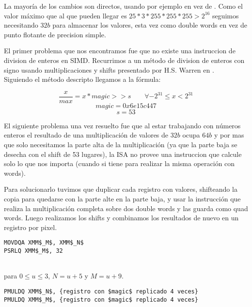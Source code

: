 La mayoría de los cambios son directos, usando por ejemplo  en vez de . Como el valor máximo que al que pueden llegar es $25 * 3 * 255 * 255 * 255 > 2^{16}$ seguimos necesitando $32b$ para almacenar los valores, esta vez como double words en vez de punto flotante de precision simple.

El primer problema que nos encontramos fue que no existe una instruccion de division de enteros en SIMD. Recurrimos a un método de division de enteros con signo usando multiplicaciones y shifts presentado por H.S. Warren en \cite[Chapter~10]{hackersdelight}. \\
Siguiendo el método descripto llegamos a la fórmula:

$$ \frac{x}{max} = x * magic >> s \qquad \forall -2^{31} \le x < 2^{31} $$
$$ magic = 0x6e15c447 $$
$$ s = 53 $$

El siguiente problema una vez resuelto fue que al estar trabajando con números enteros el resultado de una multiplicación de valores de $32b$ ocupa $64b$ y por mas que solo necesitamos la parte alta de la multiplicación (ya que la parte baja se desecha con el shift de 53 lugares), la ISA no provee una instruccion que calcule solo lo que nos importa (cuando si tiene  para realizar la misma operación con words).

Para solucionarlo tuvimos que duplicar cada registro con valores, shifteando la copia para quedarse con la parte alte en la parte baja, y usar la instrucción  que realiza la multiplicación completa sobre dos double words y las guarda como quad words.
Luego realizamos los shifts y combinamos los resultados de nuevo en un registro por pixel.

\begin{lstlisting}
MOVDQA XMM$_M$, XMM$_N$
PSRLQ XMM$_M$, 32
\end{lstlisting}

 

  \\
para $0 \le u \le 3$, $N = u+5$ y $M = u+9$.

\begin{lstlisting}
PMULDQ XMM$_N$, {registro con $magic$ replicado 4 veces}
PMULDQ XMM$_M$, {registro con $magic$ replicado 4 veces}
\end{lstlisting}

 

